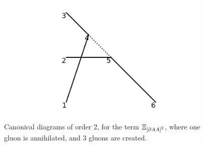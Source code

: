 \documentclass[11pt,a4paper,twoside,pdf]{article}
\numberwithin{equation}{section}
\begin{document}
\begin{figure}[h!]
\begin{subfigure}[t]{0.33\textwidth}
        \caption{ }
    \end{subfigure}
    \begin{subfigure}[t]{0.33\textwidth}
        \centering
        \includegraphics[width=\textwidth]{plots/canonical/order2/3.png}
        \caption{ }
    \end{subfigure}
    \caption{Canonical diagrams of order 2, for the term $\Xi_{\left[ \partial AA \right]^2}$, 
    where one gluon is annihilated, and 3 gluons are created.}
    \label{fig:cannonical2_1to3}
\end{figure}
\end{document}
